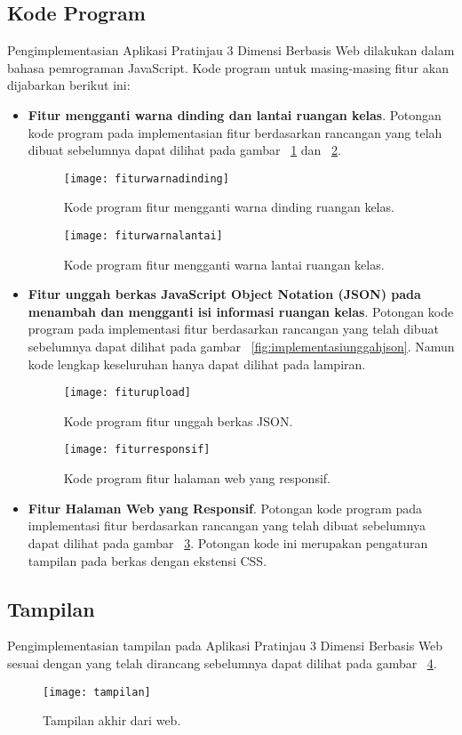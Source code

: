 \subsection{Kode Program}
\label{sec:kodeprogram}
Pengimplementasian Aplikasi Pratinjau 3 Dimensi Berbasis Web dilakukan dalam bahasa pemrograman JavaScript. Kode program untuk masing-masing fitur akan dijabarkan berikut ini:
\begin{itemize}
	\item {\bf Fitur mengganti warna dinding dan lantai ruangan kelas}.
	Potongan kode program pada implementasian fitur berdasarkan rancangan yang telah dibuat sebelumnya dapat dilihat pada gambar ~\ref{fig:implementasidinding} dan ~\ref{fig:implementasilantai}.
	\begin{figure}[ht]
		\centering
		\texttt{[image: fiturwarnadinding]}
		\caption{Kode program fitur mengganti warna dinding ruangan kelas.}
		\label{fig:implementasidinding}
	\end{figure}
	
	\begin{figure}[!hb]
		\centering
		\texttt{[image: fiturwarnalantai]}
		\caption{Kode program fitur mengganti warna lantai ruangan kelas.}
		\label{fig:implementasilantai}
	\end{figure}
	\item {\bf Fitur unggah berkas JavaScript Object Notation (JSON) pada menambah dan mengganti isi informasi ruangan kelas}.
	Potongan kode program pada implementasi fitur berdasarkan rancangan yang telah dibuat sebelumnya dapat dilihat pada gambar ~\ref{fig:implementasiunggahjson}. Namun kode lengkap keseluruhan hanya dapat dilihat pada lampiran.
	\begin{figure}[ht]
		\centering
		\texttt{[image: fiturupload]}
		\caption{Kode program fitur unggah berkas JSON.}
		\label{fig:implementasiunggahjson}
		\vspace{8mm}
		\texttt{[image: fiturresponsif]}
		\caption{Kode program fitur halaman web yang responsif.}
		\label{fig:implementasiweb}
	\end{figure}
	\item {\bf Fitur Halaman Web yang Responsif}.
	Potongan kode program pada implementasi fitur berdasarkan rancangan yang telah dibuat sebelumnya dapat dilihat pada gambar ~\ref{fig:implementasiweb}. Potongan kode ini merupakan pengaturan tampilan pada berkas dengan ekstensi CSS.
\end{itemize}

\subsection{Tampilan}
\label{sec:tampilan}
Pengimplementasian tampilan pada Aplikasi Pratinjau 3 Dimensi Berbasis Web sesuai dengan yang telah dirancang sebelumnya dapat dilihat pada gambar ~\ref{fig:tampilan}.
\begin{figure}[ht]
	\centering
	\texttt{[image: tampilan]}
	\caption{Tampilan akhir dari web.}
	\label{fig:tampilan}
\end{figure}

